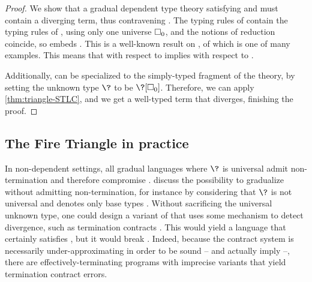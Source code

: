 \begin{proof}
  We show that a gradual dependent type theory satisfying  and 
  must contain a diverging term, thus contravening .
  The typing rules of  contain the typing rules of ,
  using only one universe $\uni[0]$,
  and the notions of reduction coincide, so  embeds
  . This is a well-known result on  , of which  is one of many examples.
  This means that  with respect to  implies 
  with respect to .

  Additionally,  can be specialized to the simply-typed fragment of the theory,
  by setting the unknown type $\?$ to be $\?[\uni[0]]$.
  Therefore, we can apply \cref{thm:triangle-STLC},
  and we get a well-typed term that diverges, finishing the proof.
\end{proof}

\subsection{The Fire Triangle in practice}

In non-dependent settings, all gradual languages where $\?$ is universal
admit non-termination and therefore compromise .
 discuss the possibility to gradualize 
without admitting non-termination, for instance by considering that $\?$ is not universal
and denotes only base types%
.
Without sacrificing the universal unknown type, one could design a variant of 
that uses some mechanism to detect divergence, such as termination contracts
. This would yield a language that certainly satisfies
, but it would break . Indeed, because the contract system is
necessarily under-approximating in order to be sound – and actually imply  –,
there are effectively-terminating programs with imprecise variants that yield termination
contract errors.

